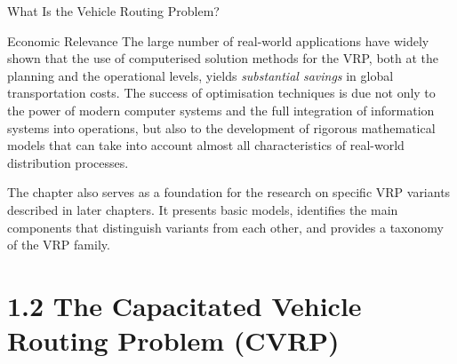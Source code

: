 \documentclass[aspectratio=169,10pt]{beamer}
\begin{document}
\begin{frame}[allowframebreaks]{What Is the Vehicle Routing Problem?}
\framebreak

\begin{alertblock}{Economic Relevance}
The large number of real-world applications have widely shown that the use of
computerised solution methods for the VRP, both at the planning and the operational
levels, yields \emph{substantial savings} in global transportation costs.  The success
of optimisation techniques is due not only to the power of modern computer systems
and the full integration of information systems into operations, but also to the
development of rigorous mathematical models that can take into account almost all
characteristics of real-world distribution processes.
\end{alertblock}

\medskip
The chapter also serves as a foundation for the research on specific VRP variants
described in later chapters.  It presents basic models, identifies the main
components that distinguish variants from each other, and provides a taxonomy of the
VRP family.

\end{frame}

\section{1.2 The Capacitated Vehicle Routing Problem (CVRP)}
\end{document}
